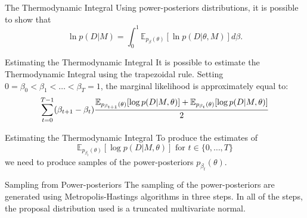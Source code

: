 \documentclass{beamer}
\newcommand{\expectation}{\mathbb{E}}
\begin{document}
\begin{frame}{The Thermodynamic Integral}
Using power-posteriors distributions, it is possible to show that
\pause
\begin{equation*}
    \ln p (D | M) = \int_0^1 \expectation_{p_\beta (\theta)} 
        [\ln p(D|\theta, M)]d\beta.
    \label{eq:marginal_likelihood_again}
\end{equation*}
\end{frame}


\begin{frame}{Estimating the Thermodynamic Integral}
It is possible to estimate the Thermodynamic Integral using the 
trapezoidal rule. \pause Setting $0 = \beta_0 < \beta_1 < \ldots 
< \beta_T = 1$, the marginal likelihood is approximately equal to:
\pause
\begin{equation*}
    \footnotesize
    \sum_{t = 0}^{T - 1} (\beta_{t + 1} - \beta_t)
\frac{
    \expectation_{p_{\beta_{t + 1}} (\theta)}[\log p(D | M, \theta)]
+ 
    \expectation_{p_{\beta_{t}} (\theta)}[\log p(D | M, \theta)]}
{2}
\end{equation*}
\end{frame}

\begin{frame}{Estimating the Thermodynamic Integral}
To produce the estimates of 
\begin{equation*}
    \expectation_{p_{\beta_{t}} (\theta)}[\log p(D | M, \theta)]
    \text{ for }
    t \in \{0, \ldots, T\}
\end{equation*}    
we need to produce samples of the 
power-posteriors $p_{\beta_{t}} (\theta)$.
\end{frame}

%
%
%
%
\begin{frame}{Sampling from Power-posteriors}
The sampling of the power-posteriors are generated using 
Metropolis-Hastings algorithms in three steps. \pause In all of the 
steps, the proposal distribution used is a truncated multivariate 
normal.
\end{frame}
\end{document}

